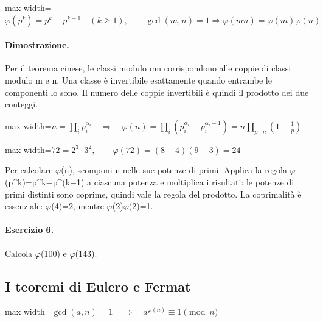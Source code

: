 \documentclass[a4paper,11pt]{article}
\begin{document}
\begin{center}\begin{adjustbox}{max width=\linewidth}$\displaystyle \varphi(p^k)=p^k-p^{k-1}\quad(k\ge1),\qquad\gcd(m,n)=1\Rightarrow\varphi(mn)=\varphi(m)\varphi(n)$\end{adjustbox}\end{center}

\paragraph{Dimostrazione.} Per il teorema cinese, le classi modulo mn corrispondono alle coppie di classi modulo m e n. Una classe è invertibile esattamente quando entrambe le componenti lo sono. Il numero delle coppie invertibili è quindi il prodotto dei due conteggi.

\begin{center}\begin{adjustbox}{max width=\linewidth}$\displaystyle n=\prod_i p_i^{\alpha_i}\quad\Longrightarrow\quad\varphi(n)=\prod_i(p_i^{\alpha_i}-p_i^{\alpha_i-1})=n\prod_{p\mid n}\left(1-\frac1p\right)$\end{adjustbox}\end{center}

\begin{center}\begin{adjustbox}{max width=\linewidth}$\displaystyle 72=2^3\cdot3^2,\qquad\varphi(72)=(8-4)(9-3)=24$\end{adjustbox}\end{center}

Per calcolare $\varphi$(n), scomponi n nelle sue potenze di primi. Applica la regola $\varphi$(p\textasciicircum{}k)=p\textasciicircum{}k$-$p\textasciicircum{}(k$-$1) a ciascuna potenza e moltiplica i risultati: le potenze di primi distinti sono coprime, quindi vale la regola del prodotto. La coprimalità è essenziale: $\varphi$(4)=2, mentre $\varphi$(2)$\varphi$(2)=1.

\paragraph{Esercizio 6.} Calcola $\varphi$(100) e $\varphi$(143).

\subsection{I teoremi di Eulero e Fermat}

\begin{center}\begin{adjustbox}{max width=\linewidth}$\displaystyle \gcd(a,n)=1\quad\Longrightarrow\quad a^{\varphi(n)}\equiv1\pmod n$\end{adjustbox}\end{center}
\end{document}
